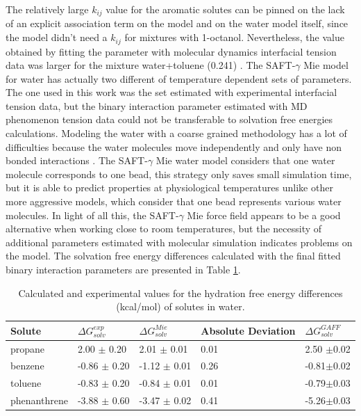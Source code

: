 The relatively large $k_{ij}$ value for the aromatic solutes can be pinned on the lack of an explicit association term on the model and on the water model itself, since the model didn't need a $k_{ij}$ for mixtures with 1-octanol. Nevertheless, the value obtained by fitting the parameter with molecular dynamics interfacial tension data was larger for the mixture water+toluene (0.241) \cite{herdes2017}.  The SAFT-$\gamma$ Mie model for water \cite{lobanova2016} has actually two different of temperature dependent sets of parameters. The one used in this work was the set estimated with experimental interfacial tension data, but the binary interaction parameter estimated with MD phenomenon tension data could not be transferable to solvation free energies calculations. Modeling the water with a coarse grained methodology has a lot of difficulties because the water molecules move independently and only have non bonded interactions \cite{hadley2010,hadley2012}. The  SAFT-$\gamma$ Mie water model considers that one water molecule corresponds to one bead, this strategy only saves small simulation time, but it is able to predict properties at physiological temperatures unlike other more aggressive models, which consider that one bead represents various water molecules. In light of all this, the SAFT-$\gamma$ Mie force field appears to be a good alternative when working close to room temperatures, but the necessity of additional parameters estimated with molecular simulation indicates problems on the model. The solvation free energy differences calculated with the final fitted binary interaction parameters are presented in Table \ref{tbl:solv2}.  

\begin{table}[H]
  \centering
  \caption{Calculated and experimental values for the hydration free energy differences  (kcal/mol) of solutes in water.}
  \label{tbl:solv2}
  \begin{tabular}{lllll}
    \hline
     Solute      & $\Delta G_{solv}^{exp}$ & $\Delta G_{solv}^{Mie}$ & Absolute Deviation & $\Delta G_{solv}^{GAFF}$ \\
    \hline
    propane      &  2.00 $\pm$ 0.20 & 2.01 $\pm$ 0.01& 0.01 &2.50 $\pm$0.02 \\
    benzene      & -0.86 $\pm$ 0.20 & -1.12 $\pm$ 0.01    &  0.26    &-0.81$\pm$0.02 \\  
    toluene      & -0.83 $\pm$ 0.20 & -0.84 $\pm$ 0.01   &  0.01    &-0.79$\pm$0.03\\
    phenanthrene & -3.88 $\pm$ 0.60 & -3.47 $\pm$ 0.02& 0.41 &-5.26$\pm$0.03 \\
    \hline
  \end{tabular}

\end{table}

